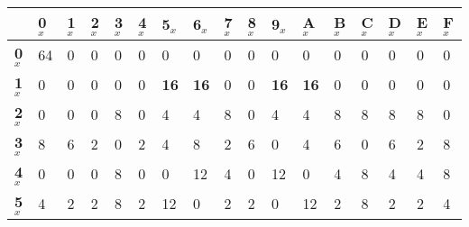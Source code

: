 \begin{longtable}[c]{|l|l|l|l|l|l|l|l|l|l|l|l|l|l|l|l|l|}
\hline
                & \textbf{0$_x$} & \textbf{1$_x$} & \textbf{2$_x$} & \textbf{3$_x$} & \textbf{4$_x$} & \textbf{5$_x$} & \textbf{6$_x$} & \textbf{7$_x$} & \textbf{8$_x$} & \textbf{9$_x$} & \textbf{A$_x$} & \textbf{B$_x$} & \textbf{C$_x$} & \textbf{D$_x$} & \textbf{E$_x$} & \textbf{F$_x$} \\ \hline
\endfirsthead
%
\endhead
%
\textbf{0$_x$}  & 64             & 0              & 0              & 0              & 0              & 0              & 0              & 0              & 0              & 0              & 0              & 0              & 0              & 0              & 0              & 0              \\ \hline
\textbf{1$_x$}  & 0              & 0              & 0              & 0              & 0              & \textbf{16}             & \textbf{16}             & 0              & 0              & \textbf{16}             & \textbf{16}             & 0              & 0              & 0              & 0              & 0              \\ \hline
\textbf{2$_x$}  & 0              & 0              & 0              & 8              & 0              & 4              & 4              & 8              & 0              & 4              & 4              & 8              & 8              & 8              & 8              & 0              \\ \hline
\textbf{3$_x$}  & 8              & 6              & 2              & 0              & 2              & 4              & 8              & 2              & 6              & 0              & 4              & 6              & 0              & 6              & 2              & 8              \\ \hline
\textbf{4$_x$}  & 0              & 0              & 0              & 8              & 0              & 0              & 12             & 4              & 0              & 12             & 0              & 4              & 8              & 4              & 4              & 8              \\ \hline
\textbf{5$_x$}  & 4              & 2              & 2              & 8              & 2              & 12             & 0              & 2              & 2              & 0              & 12             & 2              & 8              & 2              & 2              & 4              \\ \hline

\end{longtable}
